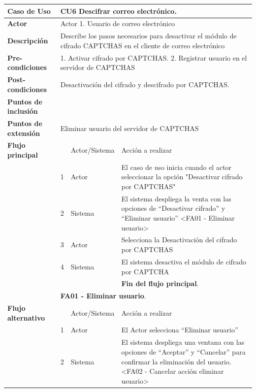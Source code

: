 \documentclass[12pt,oneside,onecolumn,openany]{report}
\begin{document}
\begin{longtable}[H]{| p{} | p{} |p{4cm}|p{5cm}|}
     \hline
     \textbf{Caso de Uso} &\multicolumn{3}{|l|}{CU6 Descifrar correo electrónico.}\\
     \hline
     \textbf{Actor} & \multicolumn{3}{|l|}{Actor 1. Usuario de correo electrónico}\\
     \hline
     \textbf{Descripción} & \multicolumn{3}{|p{10cm}|}{Describe los pasos necesarios para desactivar el módulo de cifrado CAPTCHAS en el cliente de correo electrónico}\\
     \hline
     \textbf{Pre-condiciones} & \multicolumn{3}{|p{10cm}|}{1. Activar cifrado por CAPTCHAS. 2. Registrar usuario en el servidor de CAPTCHAS}\\
     \hline
     \textbf{Post-condiciones} & \multicolumn{3}{|l|}{Desactivación del cifrado y descifrado por CAPTCHAS.}\\
     \hline
     \textbf{Puntos de inclusión} & \multicolumn{3}{|l|}{}\\
     \hline
     \textbf{Puntos de extensión} & \multicolumn{3}{|l|}{Eliminar usuario del servidor de CAPTCHAS}\\
     \hline
     \textbf{Flujo principal} & & Actor/Sistema & Acción a realizar\\
     \hline
     & 1 & Actor & El caso de uso inicia cuando el actor seleccionar la opción "Desactivar cifrado por CAPTCHAS"\\
     \hline
     & 2 & Sistema & El sistema despliega la venta con las opciones de ``Desactivar cifrado'' y ``Eliminar usuario'' <FA01 - Eliminar usuario>\\
     \hline
     & 3 & Actor & Selecciona la Desactivación del cifrado por CAPTCHAS\\
     \hline
     & 4 & Sistema & El sistema desactiva el módulo de cifrado por CAPTCHA\\
     \hline
     & & & \textbf{Fin del flujo principal}.\\
     \hline
    & \multicolumn{3}{|l|}{\textbf{FA01 - Eliminar usuario}.}\\
    \hline
    \textbf{Flujo alternativo} & & Actor/Sistema & Acción a realizar\\
    \hline
    & 1 & Actor & El Actor selecciona ``Eliminar usuario''\\
    \hline
    & 2 & Sistema & El sistema despliega una ventana con las opciones de ``Aceptar'' y ``Cancelar'' para confirmar la eliminación del usuario. <FA02 - Cancelar acción eliminar usuario>\\

\end{longtable}
\end{document}
